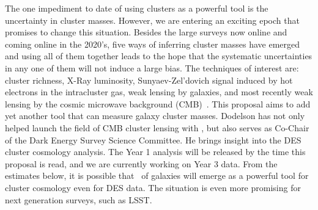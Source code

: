 The one impediment to date of using clusters as a powerful tool is the
uncertainty in cluster masses. However, we are entering an exciting
epoch that promises to change this situation. Besides the large
surveys now online and coming online in the 2020's, five ways of
inferring cluster masses have emerged and using all of them together
leads to the hope that the systematic uncertainties in any one of them
will not induce a large bias. The techniques of interest are: cluster
richness, X-Ray luminosity, Sunyaev-Zel'dovich signal induced by hot
electrons in the intracluster gas, weak lensing by galaxies, and most
recently weak lensing by the cosmic microwave background 
(CMB)~\cite{Liu:2014pqa,Baxter:2014frs,2014MNRAS.439.1628Z,melchior2017,simet2017,Baxter:2017ixz}. This
proposal aims to add yet another tool that can measure galaxy cluster
masses. Dodelson has not only helped launch the field of CMB cluster lensing with \cite{Baxter:2014frs}, but also serves as Co-Chair of the
Dark Energy Survey Science Committee. He brings insight into the DES cluster cosmology analysis. The Year 1 analysis will be released by the time this proposal is read, and we are currently working on Year 3 data. From the estimates below, it is possible that \atf\ of galaxies will emerge as a powerful tool for cluster cosmology even for DES data. The situation is even more promising for next generation surveys, such as LSST.



